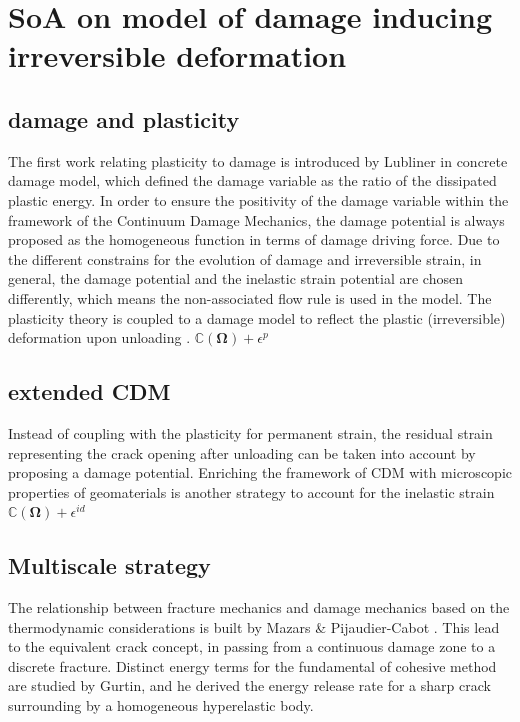 \documentclass[preprint,review,12pt]{elsarticle}
\begin{document}
\section{SoA on model of damage inducing irreversible deformation}

\subsection{damage and plasticity} 
The first work relating plasticity to damage is introduced by Lubliner \cite{Lubliner1989} in concrete damage model, which defined the damage variable as the ratio of the dissipated plastic energy. In order to ensure the positivity of the damage variable within the 
framework of the Continuum Damage Mechanics, the damage potential is always
proposed as the homogeneous function in terms of damage driving force. Due 
to the different constrains for the evolution of damage and irreversible 
strain, in general, the damage potential and the inelastic strain potential
are chosen differently, which means the non-associated flow rule is used in
the model. The plasticity theory is coupled  to a damage model 
to reflect the plastic (irreversible) deformation upon unloading \cite{Abualrub2010,Cicekli2007,Murakami1996}.      
$\mathbb{C}(\bm\Omega)+\epsilon^{p}$

\subsection{extended CDM}
Instead of coupling with the plasticity for permanent strain, the residual strain representing the crack opening after unloading can be taken into account by proposing a damage potential. 
\cite{Halm1998,Homand-Etienne1998}
Enriching the framework of CDM with microscopic properties of geomaterials is another strategy to account for the inelastic strain $\mathbb{C}(\bm\Omega)+\epsilon^{id}$

\subsection{Multiscale strategy}
 
The relationship between fracture mechanics and damage mechanics based on the thermodynamic considerations is built by Mazars \& Pijaudier-Cabot \cite{Mazars1996}. This lead to the equivalent crack concept, in passing from a continuous damage zone to a discrete fracture. Distinct energy terms for the fundamental of cohesive method are studied by Gurtin, and he derived the energy release rate for a sharp crack surrounding by a homogeneous hyperelastic body.
 
\end{document}
